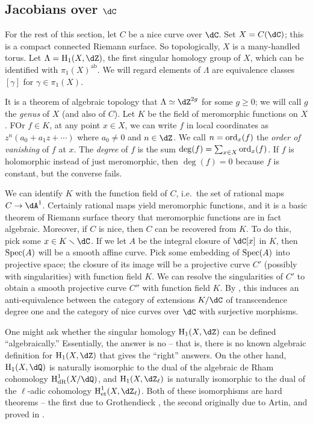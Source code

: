 \subsection{Jacobians over \texorpdfstring{$\dC$}{C}}

For the rest of this section, let $C$ be a nice curve over $\dC$. Set 
$X=C(\dC)$; this is a compact connected Riemann surface. So 
topologically, $X$ is a many-handled torus. Let $\Lambda=\h_1(X,\dZ)$, 
the first singular homology group of $X$, which can be identified with 
$\pi_1(X)^\text{ab}$. We will regard elements of $\Lambda$ are equivalence 
classes $[\gamma]$ for $\gamma\in \pi_1(X)$. 


It is a theorem of algebraic topology that $\Lambda\simeq\dZ^{2 g}$ for some 
$g\geqslant 0$; we 
will call $g$ the \emph{genus} of $X$ (and also of $C$). Let $K$ be the field 
of meromorphic functions on $X$. FOr $f\in K$, at any point 
$x\in X$, we can write $f$ in local coordinates as $z^n(a_0+a_1 z+\cdots)$ 
where $a_0\ne 0$ and $n\in\dZ$. We call $n=\operatorname{ord}_x(f)$ the \emph{order 
of vanishing} of $f$ at $x$. The \emph{degree} of $f$ is the sum 
$\deg(f)=\sum_{x\in X}\operatorname{ord}_x(f)$. If $f$ is holomorphic instead of just 
meromorphic, then $\deg(f)=0$ because $f$ is constant, but the converse fails. 
 
We can identify $K$ with the function field of $C$, i.e.\ the set of rational 
maps $C\to\dA^1$. Certainly rational maps yield meromorphic functions, 
and it is a basic theorem of Riemann surface theory that meromorphic functions 
are in fact algebraic. Moreover, if $C$ is nice, then $C$ can be recovered 
from $K$. To do this, pick some $x\in K\smallsetminus \dC$. If we let $A$ be 
the integral closure of $\dC[x]$ in $K$, then $\operatorname{Spec}(A)$ will be a 
smooth affine curve. Pick some embedding of $\operatorname{Spec}(A)$ into projective space; 
the closure of its image will be a projective curve $C'$ (possibly with 
singularities) with function field $K$. We can resolve the singularities of 
$C'$ to obtain a smooth projective curve $C''$ with function field $K$. By 
\cite[I.6.12]{ha77}, this induces an anti-equivalence between the category of 
extensions $K/\dC$ of transcendence degree one and the category of nice 
curves over $\dC$ with surjective morphisms. 

One might ask whether the singular homology $\h_1(X,\dZ)$ can be 
defined ``algebraically.'' Essentially, the answer is no -- that is, there is 
no known algebraic definition for $\h_1(X,\dZ)$ that gives the 
``right'' answers. On the other hand, $\h_1(X,\dQ)$ is naturally 
isomorphic to the dual of the algebraic de Rham cohomology 
$\h_\text{dR}^1(X/\dQ)$, and $\h_1(X,\dZ_\ell)$ is naturally 
isomorphic to the dual of the $\ell$-adic cohomology 
$\h_\text{et}^1(X,\dZ_\ell)$. Both of these isomorphisms are hard 
theorems -- the first due to Grothendieck \cite{gr66}, the 
second originally due to Artin, and proved in \cite[I 4.6.3]{de77}. 

